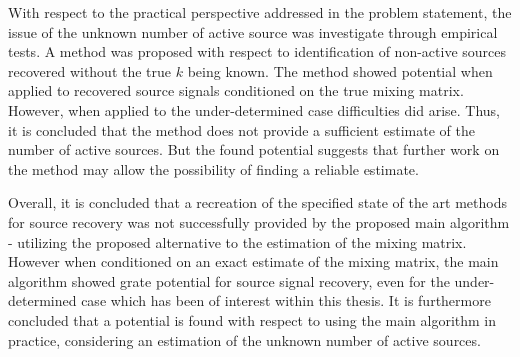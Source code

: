With respect to the practical perspective addressed in the problem statement, the issue of the unknown number of active source was investigate through empirical tests. A method was proposed with respect to identification of non-active sources recovered without the true $k$ being known.
The method showed potential when applied to recovered source signals conditioned on the true mixing matrix. However, when applied to the under-determined case difficulties did arise. Thus, it is concluded that the method does not provide a sufficient estimate of the number of active sources. But the found potential suggests that further work on the method may allow the possibility of finding a reliable estimate. 

Overall, it is concluded that a recreation of the specified state of the art methods for source recovery was not successfully provided by the proposed main algorithm - utilizing the proposed alternative to the estimation of the mixing matrix. However when conditioned on an exact estimate of the mixing matrix, the main algorithm showed grate potential for source signal recovery, even for the under-determined case which has been of interest within this thesis. 
It is furthermore concluded that a potential is found with respect to using the main algorithm in practice, considering an estimation of the unknown number of active sources. 
